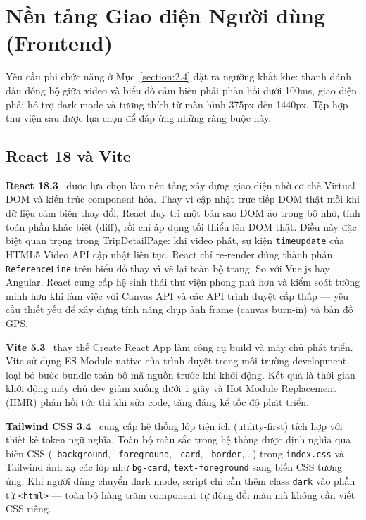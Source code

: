 \documentclass[../DoAn.tex]{subfiles}
\begin{document}
\section{Nền tảng Giao diện Người dùng (Frontend)}
\label{section:3.1}

Yêu cầu phi chức năng ở Mục~\ref{section:2.4} đặt ra ngưỡng khắt khe: thanh đánh dấu đồng bộ giữa video và biểu đồ cảm biến phải phản hồi dưới 100ms, giao diện phải hỗ trợ dark mode và tương thích từ màn hình 375px đến 1440px. Tập hợp thư viện sau được lựa chọn để đáp ứng những ràng buộc này.

\subsection{React 18 và Vite}

\textbf{React 18.3}~\cite{reactjs} được lựa chọn làm nền tảng xây dựng giao diện nhờ cơ chế Virtual DOM và kiến trúc component hóa. Thay vì cập nhật trực tiếp DOM thật mỗi khi dữ liệu cảm biến thay đổi, React duy trì một bản sao DOM ảo trong bộ nhớ, tính toán phần khác biệt (diff), rồi chỉ áp dụng tối thiểu lên DOM thật. Điều này đặc biệt quan trọng trong TripDetailPage: khi video phát, sự kiện \texttt{timeupdate} của HTML5 Video API cập nhật liên tục, React chỉ re-render đúng thành phần \texttt{ReferenceLine} trên biểu đồ thay vì vẽ lại toàn bộ trang. So với Vue.js hay Angular, React cung cấp hệ sinh thái thư viện phong phú hơn và kiểm soát tường minh hơn khi làm việc với Canvas API và các API trình duyệt cấp thấp --- yêu cầu thiết yếu để xây dựng tính năng chụp ảnh frame (canvas burn-in) và bản đồ GPS.

\textbf{Vite 5.3}~\cite{vite} thay thế Create React App làm công cụ build và máy chủ phát triển. Vite sử dụng ES Module native của trình duyệt trong môi trường development, loại bỏ bước bundle toàn bộ mã nguồn trước khi khởi động. Kết quả là thời gian khởi động máy chủ dev giảm xuống dưới 1 giây và Hot Module Replacement (HMR) phản hồi tức thì khi sửa code, tăng đáng kể tốc độ phát triển.

\textbf{Tailwind CSS 3.4}~\cite{tailwindcss} cung cấp hệ thống lớp tiện ích (utility-first) tích hợp với thiết kế token ngữ nghĩa. Toàn bộ màu sắc trong hệ thống được định nghĩa qua biến CSS (\texttt{--background}, \texttt{--foreground}, \texttt{--card}, \texttt{--border},...) trong \texttt{index.css} và Tailwind ánh xạ các lớp như \texttt{bg-card}, \texttt{text-foreground} sang biến CSS tương ứng. Khi người dùng chuyển dark mode, script chỉ cần thêm class \texttt{dark} vào phần tử \texttt{<html>} --- toàn bộ hàng trăm component tự động đổi màu mà không cần viết CSS riêng.
\end{document}

